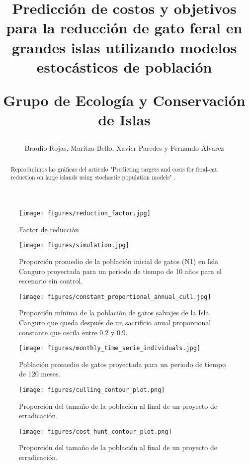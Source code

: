 \documentclass{article} %
\author{Braulio Rojas, Maritza Bello, Xavier Paredes y Fernando Alvarez}
\title{Predicción de costos y objetivos para la reducción de gato feral en grandes islas utilizando
modelos estocásticos de población \\ \begin{large} Grupo de Ecología y Conservación de Islas
\end{large}}
\begin{document}
\maketitle

\begin{abstract}

Reprodujimos las gráficas del artículo "Predicting targets and costs for feral-cat reduction on
large islands using stochastic population models" \cite{venning2021predicting}.

\end{abstract}


\begin{figure}[H]
    \centering
\texttt{[image: figures/reduction\_factor.jpg]}
\caption{Factor de reducción}
\label{fig:reductionFactor}
\end{figure}

\begin{figure}[H]
    \centering
\texttt{[image: figures/simulation.jpg]}
\caption{Proporción promedio de la población inicial de gatos (N1) en Isla Canguro proyectada para
un periodo de tiempo de 10 años para el escenario sin control.}
\label{fig:simulation}
\end{figure}

\begin{figure}[H]
    \centering
\texttt{[image: figures/constant\_proportional\_annual\_cull.jpg]}
\caption{Proporción mínima de la población de gatos salvajes de la Isla Canguro que queda después de
un sacrificio anual proporcional constante que oscila entre 0.2 y 0.9.}
\label{fig:constantProportionalAnnualCull}
\end{figure}

\begin{figure}[H]
    \centering
\texttt{[image: figures/monthly\_time\_serie\_individuals.jpg]}
\caption{Población promedio de gatos proyectada para un periodo de tiempo de 120 meses.}
\label{fig:monthlyTimeSerieIndividuals}
\end{figure}

\begin{figure}[H]
\centering
\texttt{[image: figures/culling\_contour\_plot.png]}
\caption{Proporción del tamaño de la población al final de un proyecto de erradicación.}
\label{fig:culling_contour_plot}
\end{figure}

\begin{figure}[H]
\centering
\texttt{[image: figures/cost\_hunt\_contour\_plot.png]}
\caption{Proporción del tamaño de la población al final de un proyecto de erradicación.}
\label{fig:culling_contour_plot}
\end{figure}
\end{document}
